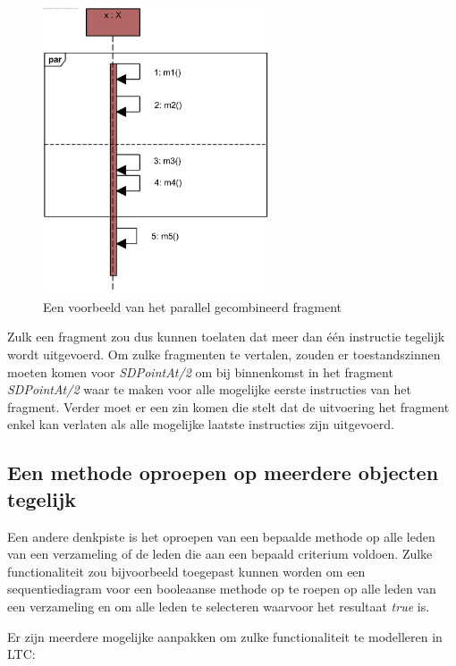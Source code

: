 \begin{figure}
	\centering
	\includegraphics[width=0.6\textwidth]{chap-declaratieve-seq/seq-par.png}
	\caption{Een voorbeeld van het parallel gecombineerd fragment}
	\label{fig:seq-par}
\end{figure}

Zulk een fragment zou dus kunnen toelaten dat meer dan \'e\'en instructie tegelijk wordt uitgevoerd. Om zulke fragmenten te vertalen, zouden er toestandszinnen moeten komen voor \textit{SDPointAt/2} om bij binnenkomst in het fragment \textit{SDPointAt/2} waar te maken voor alle mogelijke eerste instructies van het fragment. Verder moet er een zin komen die stelt dat de uitvoering het fragment enkel kan verlaten als alle mogelijke laatste instructies zijn uitgevoerd.

\subsection{Een methode oproepen op meerdere objecten tegelijk}

Een andere denkpiste is het oproepen van een bepaalde methode op alle leden van een verzameling of de leden die aan een bepaald criterium voldoen. Zulke functionaliteit zou bijvoorbeeld toegepast kunnen worden om een sequentiediagram voor een booleaanse methode op te roepen op alle leden van een verzameling en om alle leden te selecteren waarvoor het resultaat \textit{true} is.

Er zijn meerdere mogelijke aanpakken om zulke functionaliteit te modelleren in LTC:


